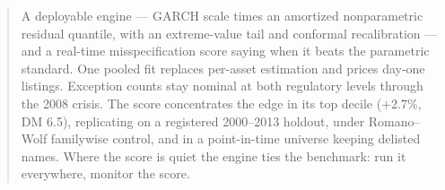\begin{abstract}
A deployable engine --- GARCH scale times an amortized nonparametric
residual quantile, with an extreme-value tail and conformal
recalibration --- and a real-time misspecification score saying
when it beats the parametric standard. One pooled fit replaces
per-asset estimation and prices day-one listings. Exception counts
stay nominal at both regulatory levels through the 2008 crisis. The
score concentrates the edge in its top decile ($+2.7\%$, DM 6.5),
replicating on a registered 2000--2013 holdout, under Romano--Wolf
familywise control, and in a point-in-time universe keeping delisted
names. Where the score is quiet the engine ties the benchmark: run
it everywhere, monitor the score.
\end{abstract}